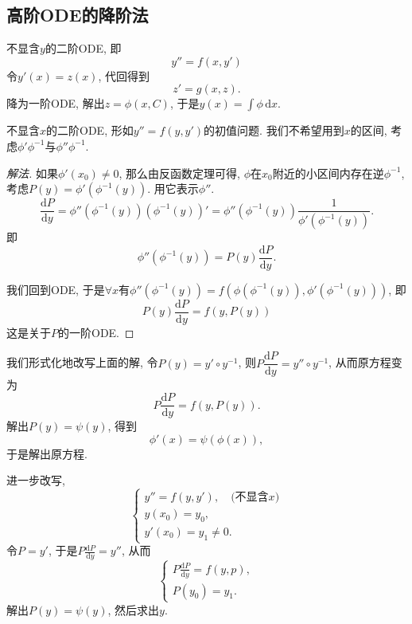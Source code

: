 \subsection{高阶ODE的降阶法}
不显含$y$的二阶ODE, 即
\begin{equation}
  y'' = f(x,y')
\end{equation}
令$y'(x) = z(x)$, 代回得到
\begin{equation}
  z' = g(x,z).
\end{equation}
降为一阶ODE, 解出$z = \phi (x,C)$, 于是$y(x) = \int \phi \, \mathrm{d} x$.

不显含$x$的二阶ODE, 形如$y'' = f(y,y')$的初值问题. 我们不希望用到$x$的区间, 考虑$\phi' \phi ^{-1}$与$\phi'' \phi ^{-1}$.
\begin{proof}[解法]
  如果$\phi'(x_0)\neq 0$, 那么由反函数定理可得, $\phi $在$x_0$附近的小区间内存在逆$\phi ^{-1}$, 考虑$P(y)= \phi' \left( \phi ^{-1} (y) \right)$. 
  用它表示$\phi ''$.
  \begin{equation}
    \frac{\mathrm{d} P}{\mathrm{d} y} = \phi '' \left( \phi ^{-1}(y) \right) \left( \phi ^{-1}(y) \right)' = \phi '' \left( \phi ^{-1}(y) \right) \frac{1}{\phi' \left( \phi ^{-1}(y) \right)}.
  \end{equation}
  即
  \begin{equation}
    \phi '' \left( \phi ^{-1}(y) \right) = P(y) \frac{\mathrm{d} P}{\mathrm{d} y}.
  \end{equation}

  我们回到ODE, 于是$\forall x$有$\phi '' \left( \phi ^{-1}(y) \right) = f\left( \phi \left( \phi ^{-1}(y) \right), \phi ' \left( \phi ^{-1}(y) \right) \right)$, 即
  \begin{equation}
    P(y) \frac{\mathrm{d} P}{\mathrm{d} y} = f(y, P(y))
  \end{equation}
  这是关于$P$的一阶ODE.
\end{proof}
我们形式化地改写上面的解, 令$P(y) = y' \circ y^{-1}$, 则$P \dfrac{\mathrm{d} P}{\mathrm{d} y} = y'' \circ y^{-1}$, 从而原方程变为
\begin{equation}
  P \frac{\mathrm{d} P}{\mathrm{d} y} = f(y, P(y)).
\end{equation}
解出$P(y) = \psi \left( y \right)$, 得到
\begin{equation}
  \phi '(x) = \psi \left( \phi (x) \right),
\end{equation}
于是解出原方程.

进一步改写,
\begin{equation}
  \begin{cases}
    y'' = f(y,y'),\quad \text{(不显含$x$)} \\
    y(x_0) = y_0, \\
    y' (x_0) = y_1 \neq 0.
  \end{cases}
\end{equation}
令$P = y'$, 于是$P \frac{\mathrm{d} P}{\mathrm{d} y} = y''$, 从而
\begin{equation}
  \begin{cases}
    P \frac{\mathrm{d} P}{\mathrm{d} y} = f(y,p), \\
    P(y_0) = y_1.
  \end{cases}
\end{equation}
解出$P(y) = \psi (y)$, 然后求出$y$.

